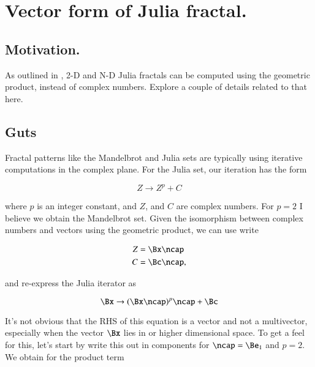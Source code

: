 %
%

\chapter{Vector form of Julia fractal.}
\label{chap:juliaVector}
{}
\date{Dec 27, 2010}

\beginArtNoToc

\section{Motivation.}

As outlined in \cite{dorst2007gac}, 2-D and N-D Julia fractals can be computed using the geometric product, instead of complex numbers.  Explore a couple of details related to that here.

\section{Guts}

Fractal patterns like the Mandelbrot and Julia sets are typically using iterative computations in the complex plane.  For the Julia set, our iteration has the form

\begin{equation}\label{eqn:juliaFractal:10}
Z \rightarrow Z^p + C
\end{equation}

where $p$ is an integer constant, and $Z$, and $C$ are complex numbers.  For $p=2$ I believe we obtain the Mandelbrot set.  Given the isomorphism between complex numbers and vectors using the geometric product, we can use write

\begin{align}\label{eqn:juliaFractal:20}
Z &= \Bx \ncap \\
C &= \Bc \ncap,
\end{align}

and re-express the Julia iterator as

\begin{equation}\label{eqn:juliaFractal:30}
\Bx \rightarrow (\Bx \ncap)^p \ncap + \Bc
\end{equation}

It's not obvious that the RHS of this equation is a vector and not a multivector, especially when the vector $\Bx$ lies in  or higher dimensional space.  To get a feel for this, let's start by write this out in components for $\ncap = \Be_1$ and $p=2$.  We obtain for the product term

